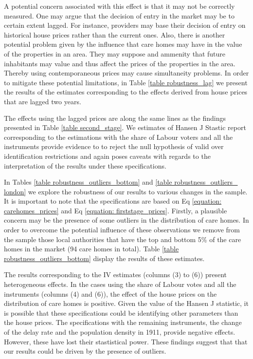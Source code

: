 \documentclass[12pt,letterpaper]{article}
\begin{document}
A potential concern associated with this effect is that it may not be correctly measured. One may argue that 
the decision of entry in the market may be to certain extent lagged. For instance, providers may base their decision of entry 
on historical house prices rather than the current ones. Also, there is another potential 
problem given by the influence that care homes may have in the value of the properties in an area. 
They may suppose and ammenity that future inhabitants may value and thus affect the prices of the 
properties in the area. Thereby using contemporaneous prices may 
cause simultaneity problems. In order to mitigate these potential limitations, in  
Table \ref{table robustness_lag} we present the results of the estimates 
corresponding to the effects 
derived from house prices that are lagged two years. 

  {}

The effects using the lagged prices are along the same lines as the findings presented in 
Table \ref{table second_stage}. We estimates of Hansen J Stastic report corresponding to the estimations with
the share of Labour voters and all the instruments provide evidence to to reject the null hypothesis of  
valid over identification restrictions and again poses caveats with regards to the 
interpretation of the results under these specifications. 


In Tables \ref{table robustness_outliers_bottom} and \ref{table robustness_outliers_ london} we explore the robustness of our results
to various changes in the sample. It is important to note that the 
specifications are based on Eq \ref{equation: carehomes_prices} 
 and Eq \ref{equation: firststage_prices}. Firstly, a plausible concern may be the presence of some outliers in
  the distribution of care homes. In order to overcome the potential influence
  of these observations we remove from the sample those local authorities that have the top and bottom 5\% of the care 
 homes in the market (94 care homes in total). Table \ref{table robustness_outliers_bottom} 
 display the results of these estimates. 
 

   {}
 
The results corresponding to the IV estimates (columns (3) to (6)) present 
heterogeneous effects. In the cases using the share of Labour votes and all the 
instruments (columns (4) and (6)), the effect of the house prices on the distribution of care homes is 
positive. Given the value of the Hansen J statistic, it is possible that these 
specifications could be identifying other parameters than the house prices. The 
specifications with the remaining instruments, the change of the delay rate and 
the population density in 1911, provide negative effects. However, these have 
lost their stastistical power. These findings suggest that that our results 
could be driven by the presence of outliers.
 
\end{document}
